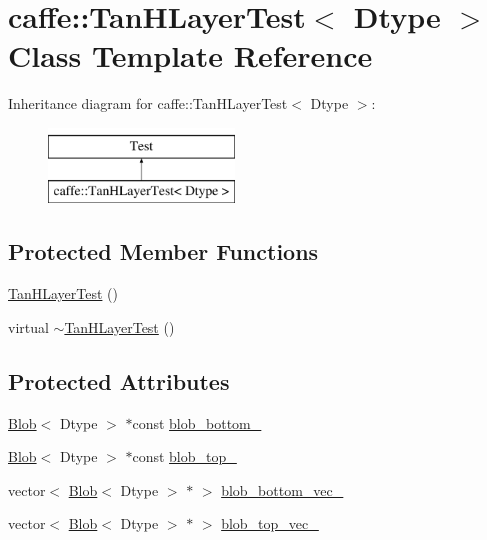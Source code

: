 \hypertarget{classcaffe_1_1_tan_h_layer_test}{\section{caffe\+:\+:Tan\+H\+Layer\+Test$<$ Dtype $>$ Class Template Reference}
\label{classcaffe_1_1_tan_h_layer_test}
}
Inheritance diagram for caffe\+:\+:Tan\+H\+Layer\+Test$<$ Dtype $>$\+:\begin{figure}[H]
\begin{center}
\leavevmode
\includegraphics[height=2.000000cm]{classcaffe_1_1_tan_h_layer_test}
\end{center}
\end{figure}
\subsection*{Protected Member Functions}
\begin{DoxyCompactItemize}
\item 
\hyperlink{classcaffe_1_1_tan_h_layer_test_a7604cd1d3e13bb4baf796a2c8327c86d}{Tan\+H\+Layer\+Test} ()
\item 
virtual \hyperlink{classcaffe_1_1_tan_h_layer_test_ab6d3230618354cf71fd6368f4c319e09}{$\sim$\+Tan\+H\+Layer\+Test} ()
\end{DoxyCompactItemize}
\subsection*{Protected Attributes}
\begin{DoxyCompactItemize}
\item 
\hyperlink{classcaffe_1_1_blob}{Blob}$<$ Dtype $>$ $\ast$const \hyperlink{classcaffe_1_1_tan_h_layer_test_a4a830828bda12a8faece535af06aca5f}{blob\+\_\+bottom\+\_\+}
\item 
\hyperlink{classcaffe_1_1_blob}{Blob}$<$ Dtype $>$ $\ast$const \hyperlink{classcaffe_1_1_tan_h_layer_test_aff624c855eeefd51b2a2f43e3c8625df}{blob\+\_\+top\+\_\+}
\item 
vector$<$ \hyperlink{classcaffe_1_1_blob}{Blob}$<$ Dtype $>$ $\ast$ $>$ \hyperlink{classcaffe_1_1_tan_h_layer_test_a81638f5f21d8906ff56c4eeeee6cc6d3}{blob\+\_\+bottom\+\_\+vec\+\_\+}
\item 
vector$<$ \hyperlink{classcaffe_1_1_blob}{Blob}$<$ Dtype $>$ $\ast$ $>$ \hyperlink{classcaffe_1_1_tan_h_layer_test_a44291748cc6643979a3dd592539f26d2}{blob\+\_\+top\+\_\+vec\+\_\+}
\end{DoxyCompactItemize}


